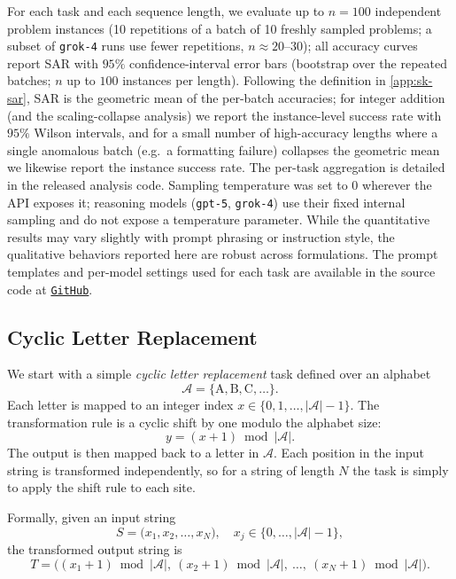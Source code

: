 \documentclass{article}
\theoremstyle{plain}
\begin{document}
For each task and each sequence length, we evaluate up to $n=100$ independent problem instances (10 repetitions of a batch of 10 freshly sampled problems; a subset of \texttt{grok-4} runs use fewer repetitions, $n\approx20$--$30$); all accuracy curves report SAR with $95\%$ confidence-interval error bars (bootstrap over the repeated batches; $n$ up to $100$ instances per length). Following the definition in \cref{app:sk-sar}, SAR is the geometric mean of the per-batch accuracies; for integer addition (and the scaling-collapse analysis) we report the instance-level success rate with $95\%$ Wilson intervals, and for a small number of high-accuracy lengths where a single anomalous batch (e.g.\ a formatting failure) collapses the geometric mean we likewise report the instance success rate. The per-task aggregation is detailed in the released analysis code. Sampling temperature was set to $0$ wherever the API exposes it; reasoning models (\texttt{gpt-5}, \texttt{grok-4}) use their fixed internal sampling and do not expose a temperature parameter. While the quantitative results may vary slightly with prompt phrasing or instruction style, the qualitative behaviors reported here are robust across formulations. The prompt templates and per-model settings used for each task are available in the source code at
\href{https://github.com/EdenCodeInc/PyCliffordMCP/tree/main/dev/pauli_string_multiplication}{\texttt{GitHub}}.

\subsection{Cyclic Letter Replacement}

We start with a simple \emph{cyclic letter replacement} task defined over an alphabet
\begin{equation}
\mathcal{A} = \{\mathrm{A}, \mathrm{B}, \mathrm{C}, \ldots\}.
\end{equation}
Each letter is mapped to an integer index $x \in \{0,1,\ldots,|\mathcal{A}|-1\}$.
The transformation rule is a cyclic shift by one modulo the alphabet size:
\begin{equation}
y = (x+1) \bmod |\mathcal{A}|.
\end{equation}
The output is then mapped back to a letter in $\mathcal{A}$. Each position in the input string is transformed independently, so for a string of length $N$ the task is simply to apply the shift rule to each site.

Formally, given an input string
\begin{equation}
S = \big(x_1, x_2, \ldots, x_N\big), \quad x_j \in \{0,\ldots,|\mathcal{A}|-1\},
\end{equation}
the transformed output string is
\begin{equation}
T = \big((x_1+1)\bmod |\mathcal{A}|,\ (x_2+1)\bmod |\mathcal{A}|,\ \ldots,\ (x_N+1)\bmod |\mathcal{A}|\big).
\end{equation}
\end{document}
